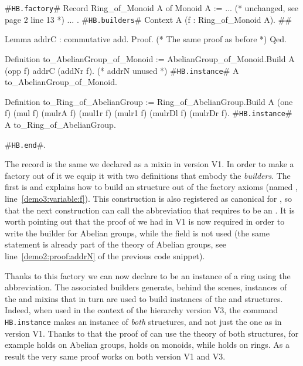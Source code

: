 \documentclass[a4paper,UKenglish,cleveref, autoref]{lipics-v2019}
\newcommand{\mixin}{mixin}
\newcommand{\mixins}{mixins}
\newcommand{\factory}{factory}
\newcommand{\phantterm}{abbreviation}
\newcommand{\builder}{builder}
\newcommand{\hbfactory}{{\tt\color{dkgreen}HB.factory}}
\newcommand{\hbinstance}{{\tt\color{dkgreen}HB.instance}}
\newcommand{\hbbuilders}{{\tt\color{dkgreen}HB.builders}}
\newcommand{\hbend}{{\tt\color{dkgreen}HB.end}}
\theoremstyle{implem}
\theoremstyle{implem}
\theoremstyle{command}
\begin{document}
\begin{coqcode}
#\hbfactory{}# Record Ring_of_Monoid A of Monoid A := {
  ... (* unchanged, see page 2 line 13 *) ...
}.
#\hbbuilders{}# Context A (f : Ring_of_Monoid A).                          #\label{demo3:variable:f}#

  Lemma addrC : commutative add. Proof. (* The same proof as before *) Qed.

  Definition to_AbelianGroup_of_Monoid :=
    AbelianGroup_of_Monoid.Build A (opp f) addrC (addNr f). (* addrN unused *)
  #\hbinstance{}# A to_AbelianGroup_of_Monoid.

  Definition to_Ring_of_AbelianGroup :=
    Ring_of_AbelianGroup.Build A (one f) (mul f)
      (mulrA f) (mul1r f) (mulr1 f) (mulrDl f) (mulrDr f).
  #\hbinstance{}# A to_Ring_of_AbelianGroup.

#\hbend{}#.
\end{coqcode}

The record  is the same we declared as a \mixin{}
in version V1. In order to make a \factory{} out of it we equip it with
two definitions that embody the \emph{\builder{}s}.
The first is  and
explains how to build an  structure out of the \factory{}
axioms (named , line~\ref{demo3:variable:f}).
This construction is also registered as canonical for ,
so that the next construction  can call
the  \phantterm{} that requires  to be
an .
It is worth pointing out that the proof of  we had in V1 is now
required in order to write the \builder{} for Abelian groups, while
the  field is not used (the same statement is already part of
the theory of Abelian groups, see line~\ref{demo2:proof:addrN} of the previous
code snippet).

Thanks to this \factory{} we can now declare  to be an instance
of a ring using the  \phantterm{}.
The associated \builder{}s generate, behind the scenes, instances of the
 and  \mixins{}
that in turn are used to build instances of the  and 
structures. Indeed, when used in the context of the hierarchy version V3,
the command \hbinstance{} 
makes  an instance of \emph{both} structures, and not just the 
one as in version V1.
Thanks to that the proof of  can use the theory of
both structures, for example  holds on Abelian groups,
 holds on monoids, while  holds on rings.
As a result the very same proof works on both
version V1 and V3.
\end{document}
